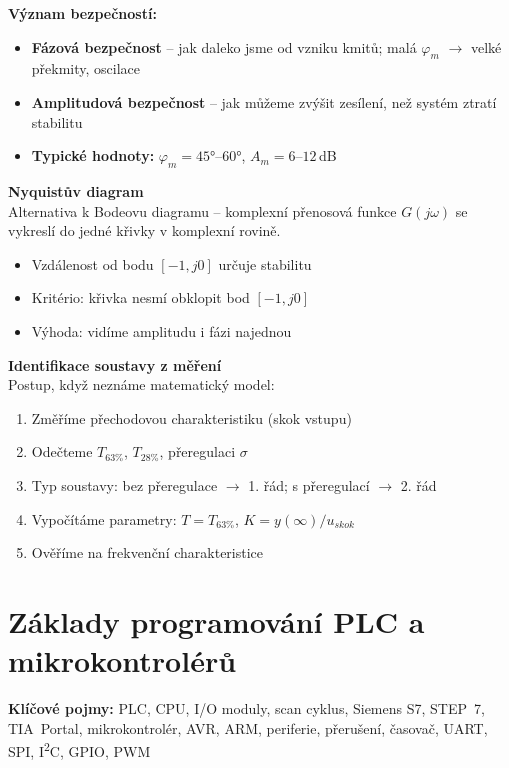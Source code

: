 \documentclass[a4paper,10pt]{article}
\begin{document}
\begin{vysvetlenibox}
\textbf{Význam bezpečností:}
\begin{itemize}[noitemsep, leftmargin=1.4em, topsep=4pt]
    \item \textbf{Fázová bezpečnost} -- jak daleko jsme od vzniku kmitů;
          malá $\varphi_m$ $\to$ velké překmity, oscilace
    \item \textbf{Amplitudová bezpečnost} -- jak můžeme zvýšit zesílení,
          než systém ztratí stabilitu
    \item \textbf{Typické hodnoty:} $\varphi_m = 45°\text{--}60°$, $A_m = 6\text{--}12$\,dB
\end{itemize}

\textbf{Nyquistův diagram}\\
Alternativa k Bodeovu diagramu -- komplexní přenosová funkce
$G(j\omega)$ se vykreslí do jedné křivky v komplexní rovině.
\begin{itemize}[noitemsep, leftmargin=1.4em, topsep=4pt]
    \item Vzdálenost od bodu $[-1, j0]$ určuje stabilitu
    \item Kritério: křivka nesmí obklopit bod $[-1, j0]$
    \item Výhoda: vidíme amplitudu i fázi najednou
\end{itemize}

\textbf{Identifikace soustavy z měření}\\
Postup, když neznáme matematický model:
\begin{enumerate}[noitemsep, leftmargin=1.4em, topsep=4pt]
    \item Změříme přechodovou charakteristiku (skok vstupu)
    \item Odečteme $T_{63\%}$, $T_{28\%}$, přeregulaci $\sigma$
    \item Typ soustavy: bez přeregulace $\to$ 1. řád; s přeregulací $\to$ 2. řád
    \item Vypočítáme parametry: $T = T_{63\%}$, $K = y(\infty)/u_{skok}$
    \item Ověříme na frekvenční charakteristice
\end{enumerate}
\end{vysvetlenibox}

\section{Základy programování PLC a mikrokontrolérů}

\begin{pojmybox}
\textbf{Klíčové pojmy:}
PLC, CPU, I/O moduly, scan cyklus, Siemens S7, STEP~7, TIA~Portal,
mikrokontrolér, AVR, ARM, periferie, přerušení, časovač, UART, SPI,
I\textsuperscript{2}C, GPIO, PWM
\end{pojmybox}
\end{document}
